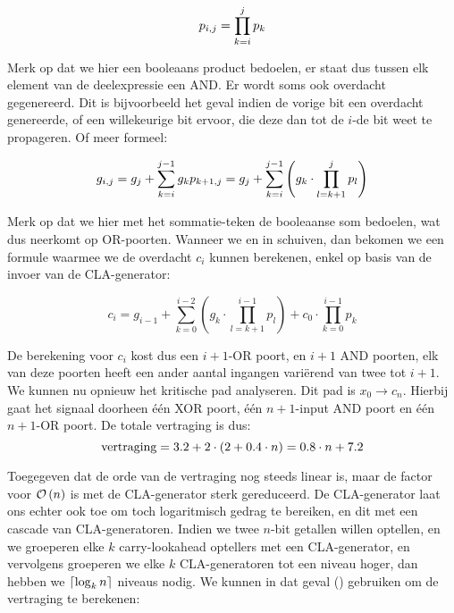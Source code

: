 \begin{equation}
p_{i,j}=\displaystyle\prod_{k=i}^j{p_k}
\eqnlab{cla-pij}
\end{equation}

Merk op dat we hier een booleaans product bedoelen, er staat dus tussen elk element van de deelexpressie een AND. Er wordt soms ook overdacht gegenereerd. Dit is bijvoorbeeld het geval indien de vorige bit een overdacht genereerde, of een willekeurige bit ervoor, die deze dan tot de $i$-de bit weet te propageren. Of meer formeel:

\begin{equation}
g_{i,j}=g_j+\displaystyle\sum_{k=i}^{j-1}{g_kp_{k+1,j}}=g_j+\displaystyle\sum_{k=i}^{j-1}{\brak{g_k\cdot\displaystyle\prod_{l=k+1}^j{p_l}}}
\eqnlab{cla-gij}
\end{equation}

Merk op dat we hier met het sommatie-teken de booleaanse som bedoelen, wat dus neerkomt op OR-poorten. Wanneer we  en  in  schuiven, dan bekomen we een formule waarmee we de overdacht $c_i$ kunnen berekenen, enkel op basis van de invoer van de CLA-generator:

\begin{equation}
c_i=g_{i-1}+\displaystyle\sum_{k=0}^{i-2}{\left(g_k\cdot\displaystyle\prod_{l=k+1}^{i-1}{p_l}\right)}+c_0\cdot\displaystyle\prod_{k=0}^{i-1}{p_k}
\end{equation}

De berekening voor $c_i$ kost dus een $i+1$-OR poort, en $i+1$ AND poorten, elk van deze poorten heeft een ander aantal ingangen vari\"erend van twee tot $i+1$. We kunnen nu opnieuw het kritische pad analyseren. Dit pad is $x_0\rightarrow c_n$. Hierbij gaat het signaal doorheen \'e\'en XOR poort, \'e\'en $n+1$-input AND poort en \'e\'en $n+1$-OR poort. De totale vertraging is dus:
\begin{equation}
\mbox{vertraging}=3.2+2\cdot\brak{2+0.4\cdot n}=0.8\cdot n+7.2
\eqnlab{delayCLAGenerator}
\end{equation}

Toegegeven dat de orde van de vertraging nog steeds linear is, maar de factor voor $\mathcal{O}\left( n \right)$ is met de CLA-generator sterk gereduceerd. De CLA-generator laat ons echter ook toe om toch logaritmisch gedrag te bereiken, en dit met een cascade van CLA-generatoren. Indien we twee $n$-bit getallen willen optellen, en we groeperen elke $k$ carry-lookahead optellers met een CLA-generator, en vervolgens groeperen we elke $k$ CLA-generatoren tot een niveau hoger, dan hebben we $\left\lceil \log_kn \right\rceil$ niveaus nodig. We kunnen in dat geval () gebruiken om de vertraging te berekenen:


